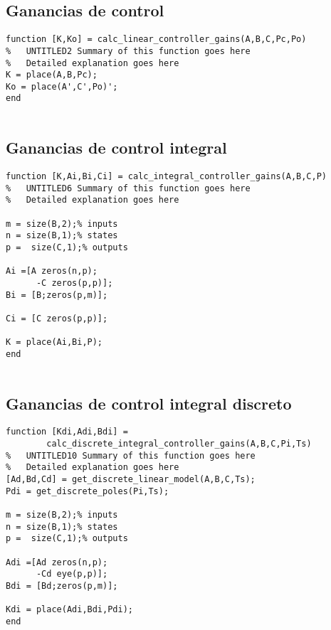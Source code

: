 \subsection{Ganancias de control}

\begin{lstlisting}[frame=single]
function [K,Ko] = calc_linear_controller_gains(A,B,C,Pc,Po)
%	UNTITLED2 Summary of this function goes here
%   Detailed explanation goes here
K = place(A,B,Pc);
Ko = place(A',C',Po)';
end


\end{lstlisting}

\subsection{Ganancias de control integral}

\begin{lstlisting}[frame=single]
function [K,Ai,Bi,Ci] = calc_integral_controller_gains(A,B,C,P)
%	UNTITLED6 Summary of this function goes here
%   Detailed explanation goes here

m = size(B,2);% inputs
n = size(B,1);% states
p =  size(C,1);% outputs

Ai =[A zeros(n,p);
      -C zeros(p,p)];
Bi = [B;zeros(p,m)];

Ci = [C zeros(p,p)];

K = place(Ai,Bi,P);
end


\end{lstlisting}

\subsection{Ganancias de control integral discreto}

\begin{lstlisting}[frame=single]
function [Kdi,Adi,Bdi] = 
		calc_discrete_integral_controller_gains(A,B,C,Pi,Ts)
%	UNTITLED10 Summary of this function goes here
%   Detailed explanation goes here
[Ad,Bd,Cd] = get_discrete_linear_model(A,B,C,Ts);
Pdi = get_discrete_poles(Pi,Ts);

m = size(B,2);% inputs
n = size(B,1);% states
p =  size(C,1);% outputs

Adi =[Ad zeros(n,p);
      -Cd eye(p,p)];
Bdi = [Bd;zeros(p,m)];

Kdi = place(Adi,Bdi,Pdi);
end

\end{lstlisting}

